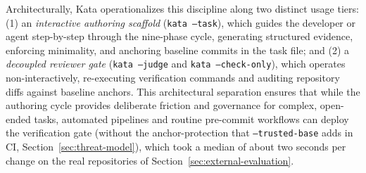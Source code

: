 \documentclass{sbc2019}%
\begin{document}
Architecturally, Kata operationalizes this discipline along two distinct usage tiers:
(1) an \emph{interactive authoring scaffold} (\texttt{kata --task}), which guides the developer or agent step-by-step through the nine-phase cycle, generating structured evidence, enforcing minimality, and anchoring baseline commits in the task file; and
(2) a \emph{decoupled reviewer gate} (\texttt{kata --judge} and \texttt{kata --check-only}), which operates non-interactively, re-executing verification commands and auditing repository diffs against baseline anchors. This architectural separation ensures that while the authoring cycle provides deliberate friction and governance for complex, open-ended tasks, automated pipelines and routine pre-commit workflows can deploy the verification gate (without the anchor-protection that \texttt{--trusted-base} adds in CI, Section~\ref{sec:threat-model}), which took a median of about two seconds per change on the real repositories of Section~\ref{sec:external-evaluation}.
\end{document}
